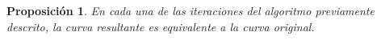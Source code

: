 \documentclass[11pt]{book}
\theoremstyle{plain} %
\newtheorem{proposicion}[teorema]{Proposición}
\theoremstyle{definition} %
\theoremstyle{definition} %
\begin{document}
\begin{proposicion}\label{prop:alg_degree_end}
    En cada una de las iteraciones del algoritmo previamente descrito, la curva resultante es equivalente a la curva original.


        
    


\end{proposicion}
\end{document}
